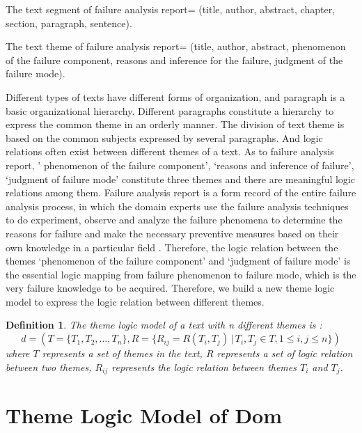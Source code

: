 \documentclass{elsarticle}
\newtheorem{definition}{Definition}
\begin{document}
\begin{itshape}
  The text segment of failure analysis report= (title, author,
  abstract, chapter, section, paragraph, sentence). 

The text theme of failure analysis report= (title, author, abstract, phenomenon of the failure component, reasons and inference for the failure, judgment of the failure mode).

\end{itshape}

Different types of texts have different forms of
organization, and paragraph is a basic organizational
hierarchy. Different paragraphs constitute a hierarchy to express the
common theme in an orderly manner. The division of text theme is based
on the common subjects expressed by several paragraphs. And logic
relations often exist between different themes of a text. As to
failure analysis report, ' phenomenon of the failure component’, ‘reasons and inference of failure’, ‘judgment of failure mode’ constitute three themes and there are meaningful logic relations among them. Failure analysis report is a form record of the entire failure analysis process, in which the domain experts use the failure analysis techniques to do experiment, observe and analyze the failure phenomena to determine the reasons for failure and make the necessary preventive measures based on their own knowledge in a particular field \cite{roberts1980stm}. Therefore, the logic relation between the themes ‘phenomenon of the failure component’ and ‘judgment of failure mode’ is the essential logic mapping from failure phenomenon to failure mode, which is the very failure knowledge to be acquired. Therefore, we build a new theme logic model to express the logic relation between different themes.



\begin{definition}
  The theme logic model of a text with n different themes is :
\[ d = (T = \{T_1,T_2,\ldots,T_n\}, R = \{R_{ij} = R(T_i,T_j) \, | \, T_i,T_j \in
T,1\le i,j \le n \}) \]
where $T$ represents a set of themes in the text, $R$ represents a set of logic relation between two themes, $R_{ij}$ represents the logic relation between themes $T_i$ and $T_j$. 

\end{definition}

\section{Theme Logic Model of Dom
}
\label{sec:theme-logic-model}
\end{document}
